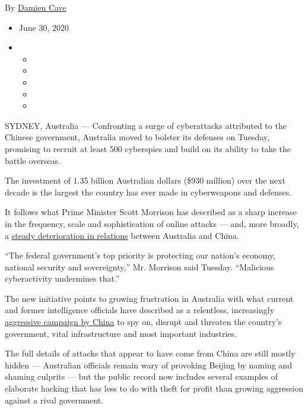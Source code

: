 By \href{https://www.nytimes.com/by/damien-cave}{Damien Cave}

\begin{itemize}
\item
  June 30, 2020
\item
  \begin{itemize}
  \item
  \item
  \item
  \item
  \item
  \end{itemize}
\end{itemize}

SYDNEY, Australia --- Confronting a surge of cyberattacks attributed to
the Chinese government, Australia moved to bolster its defenses on
Tuesday, promising to recruit at least 500 cyberspies and build on its
ability to take the battle overseas.

The investment of 1.35 billion Australian dollars (\$930 million) over
the next decade is the largest the country has ever made in cyberweapons
and defenses.

It follows what Prime Minister Scott Morrison has described as a sharp
increase in the frequency, scale and sophistication of online attacks
--- and, more broadly, a
\href{https://www.nytimes.com/2020/06/26/world/australia/politician-home-raid-china-influence.html}{steady
deterioration in relations} between Australia and China.

``The federal government's top priority is protecting our nation's
economy, national security and sovereignty,'' Mr. Morrison said Tuesday.
``Malicious cyberactivity undermines that.''

The new initiative points to growing frustration in Australia with what
current and former intelligence officials have described as a
relentless, increasingly
\href{https://www.nytimes.com/2019/05/20/world/australia/australia-china.html}{aggressive
campaign by China} to spy on, disrupt and threaten the country's
government, vital infrastructure and most important industries.

The full details of attacks that appear to have come from China are
still mostly hidden --- Australian officials remain wary of provoking
Beijing by naming and shaming culprits --- but the public record now
includes several examples of elaborate hacking that has less to do with
theft for profit than growing aggression against a rival government.

